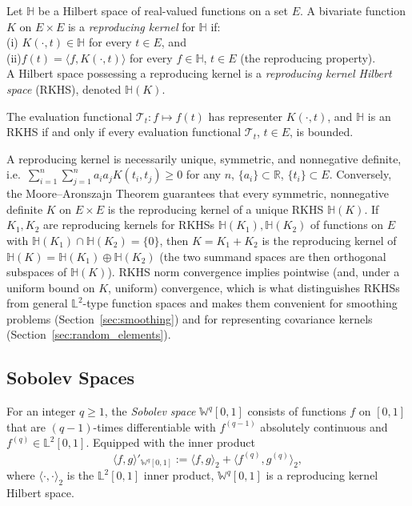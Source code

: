 \begin{definition}
\label{def:rkhs}
Let $\mathbb{H}$ be a Hilbert space of real-valued functions on a set $E$.
A bivariate function $K$ on $E\times E$ is a \emph{reproducing kernel} for
$\mathbb{H}$ if:\\ 
(i) $K(\cdot,t)\in\mathbb{H}$ for every $t\in E$, and\\ 
(ii)$f(t) = \langle f,K(\cdot,t)\rangle$ for every $f\in\mathbb{H}$, $t\in E$
(the reproducing property).\\
A Hilbert space possessing a reproducing kernel is a \emph{reproducing kernel Hilbert space} (RKHS), denoted
$\mathbb{H}(K)$. 
\end{definition}
The evaluation functional $\mathcal{T}_t:f\mapsto f(t)$
has representer $K(\cdot,t)$, and $\mathbb{H}$ is an RKHS if and only if
every evaluation functional $\mathcal{T}_t$, $t\in E$, is bounded.


A reproducing kernel is necessarily unique, symmetric, and nonnegative
definite, i.e.\ $\sum_{i=1}^n\sum_{j=1}^n a_ia_jK(t_i,t_j)\geq 0$ for any
$n$, $\{a_i\}\subset\mathbb{R}$, $\{t_i\}\subset E$. Conversely, the
Moore--Aronszajn Theorem guarantees that every symmetric, nonnegative
definite $K$ on $E\times E$ is the reproducing kernel of a unique RKHS
$\mathbb{H}(K)$. If $K_1,K_2$ are reproducing kernels for RKHSs
$\mathbb{H}(K_1),\mathbb{H}(K_2)$ of functions on $E$ with
$\mathbb{H}(K_1)\cap\mathbb{H}(K_2)=\{0\}$, then $K=K_1+K_2$ is the
reproducing kernel of $\mathbb{H}(K)=\mathbb{H}(K_1)\oplus\mathbb{H}(K_2)$
(the two summand spaces are then orthogonal subspaces of $\mathbb{H}(K)$).
RKHS norm convergence implies pointwise (and, under a
uniform bound on $K$, uniform) convergence, which is what distinguishes
RKHSs from general $\mathbb{L}^2$-type function spaces and makes them
convenient for smoothing problems (Section~\ref{sec:smoothing}) and for
representing covariance kernels (Section~\ref{sec:random_elements}).

\subsection{Sobolev Spaces}

\begin{definition}
\label{def:sobolev}
For an integer $q\geq 1$, the \emph{Sobolev space} $\mathbb{W}^q[0,1]$
consists of functions $f$ on $[0,1]$ that are $(q-1)$-times differentiable
with $f^{(q-1)}$ absolutely continuous and $f^{(q)}\in\mathbb{L}^2[0,1]$.
Equipped with the inner product
\begin{equation}
\langle f,g\rangle'_{\mathbb{W}^q[0,1]} := \langle f,g\rangle_2 +
\langle f^{(q)},g^{(q)}\rangle_2,
\label{eq:sobolev_ip}
\end{equation}
where $\langle\cdot,\cdot\rangle_2$ is the $\mathbb{L}^2[0,1]$ inner
product, $\mathbb{W}^q[0,1]$ is a reproducing kernel Hilbert space.
\end{definition}

